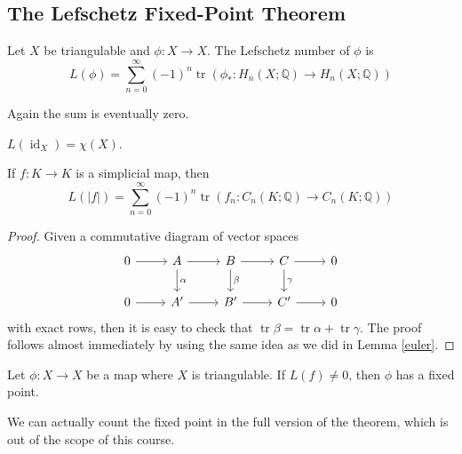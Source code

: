 \subsection{The Lefschetz Fixed-Point Theorem}
\begin{definition}
    Let $X$ be triangulable and $\phi:X\to X$.
    The Lefschetz number of $\phi$ is
    $$L(\phi)=\sum_{n=0}^\infty(-1)^n\operatorname{tr}(\phi_\ast:H_n(X;\mathbb Q)\to H_n(X;\mathbb Q))$$
\end{definition}
Again the sum is eventually zero.
\begin{example}
    $L(\operatorname{id}_X)=\chi(X)$.
\end{example}
\begin{lemma}
    If $f:K\to K$ is a simplicial map, then
    $$L(|f|)=\sum_{n=0}^\infty (-1)^n\operatorname{tr}(f_n:C_n(K;\mathbb Q)\to C_n(K;\mathbb Q))$$
\end{lemma}
\begin{proof}
    Given a commutative diagram of vector spaces
    \[
        \begin{tikzcd}
            0\arrow{r}&A\arrow{d}{\alpha}\arrow{r}&B\arrow{d}{\beta}\arrow{r}&C\arrow{d}{\gamma}\arrow{r}&0\\
            0\arrow{r}&A'\arrow{r}&B'\arrow{r}&C'\arrow{r}&0
        \end{tikzcd}
    \]
    with exact rows, then it is easy to check that $\operatorname{tr}\beta=\operatorname{tr}\alpha+\operatorname{tr}\gamma$.
    The proof follows almost immediately by using the same idea as we did in Lemma \ref{euler}.
\end{proof}
\begin{theorem}
    Let $\phi:X\to X$ be a map where $X$ is triangulable.
    If $L(f)\neq 0$, then $\phi$ has a fixed point.
\end{theorem}
We can actually count the fixed point in the full version of the theorem, which is out of the scope of this course.
